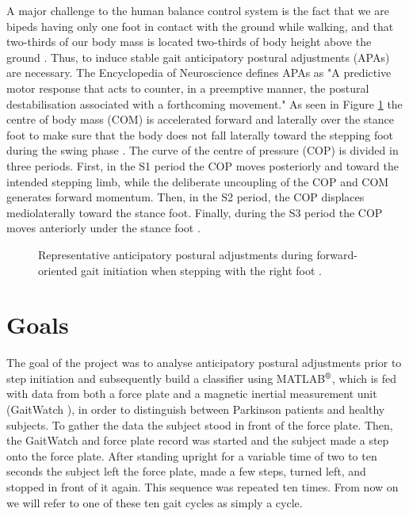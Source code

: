 A major challenge to the human balance control system is the fact that we are bipeds having only one foot in contact with the ground while walking, and that two-thirds  of our body mass is located two-thirds of body height above the ground \cite{halliday_initiation_1998}. Thus, to induce stable gait anticipatory postural adjustments (APAs) are necessary. The Encyclopedia of Neuroscience \cite[p.133]{woollacott_anticipatory_2009} defines APAs as "A predictive motor response that acts to counter, in a preemptive manner, the postural destabilisation associated with a forthcoming movement." As seen in Figure \ref{fig:APAoverview} the centre of body mass (COM) is accelerated forward and laterally over the stance foot to make sure that the body does not fall laterally toward the stepping foot during the swing phase \cite{woollacott_anticipatory_2009}. The curve of the centre of pressure (COP) is divided in three periods. First, in the S1 period the COP moves posteriorly and toward the intended stepping limb, while the deliberate uncoupling of the COP and COM generates forward momentum. Then, in the S2 period, the COP displaces mediolaterally toward the stance foot. Finally, during the S3 period the COP moves anteriorly under the stance foot \cite{hass_gait_2005-1}.

\begin{figure}
	\centering
	\caption{Representative anticipatory postural adjustments during forward-oriented gait initiation when stepping with the right foot \cite{hass_gait_2005-1}.}
	\label{fig:APAoverview}
\end{figure}


\section{Goals}
\label{data_gathering_protocol}
The goal of the project was to analyse anticipatory postural adjustments prior to step initiation and subsequently build a classifier using MATLAB$\textsuperscript{\textregistered}$, which is fed with data from both a force plate and a magnetic inertial measurement unit (GaitWatch \cite{olivares_vicente_gaitwatch_2013}), in order to distinguish between Parkinson patients and healthy subjects. To gather the data the subject stood in front of the force plate. Then, the GaitWatch and force plate record was started and the subject made a step onto the force plate. After standing upright for a variable time of two to ten seconds the subject left the force plate, made a few steps, turned left, and stopped in front of it again. This sequence was repeated ten times. From now on we will refer to one of these ten gait cycles as simply a cycle.


